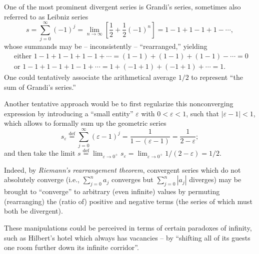 One of the most prominent divergent series is Grandi's series,\cite{Sloane_oeis.org/A033999}
sometimes also referred to as
Leibniz series\cite{leibnitz-1860,moore-1938,Hardy:1949,everest-2003}
\begin{equation}
s = \sum_{j=0}^\infty (-1)^j=
\lim_{n \rightarrow \infty} \left[\frac{1}{2}+\frac{1}{2}\left( -1\right)^n\right]
=1-1+1-1+1-\cdots ,
\label{2009-fiftyfifty-1s}
\end{equation}
whose summands may be -- inconsistently
-- ``rearranged,''
yielding
\begin{equation*}
\begin{split}
\textrm{ either }
1-1+1-1+1-1+\cdots = (1-1)+(1-1)+(1-1)-\cdots =0\\
\textrm{ or }
1-1+1-1+1-1+\cdots = 1+(-1+1)+ (-1+1) +\cdots =1.
\end{split}
\end{equation*}
One could tentatively associate the arithmetical average $1/2$ to represent ``the sum of Grandi's series.''

Another tentative approach  would be to first regularize this nonconverging expression by introducing a ``small entity''
$\varepsilon$ with $0 < \varepsilon <1$, such that $\vert \varepsilon - 1 \vert  <1$, which allows to formally sum up the geometric series
\begin{equation*}
s_\varepsilon \stackrel{\text{def}}{=} \sum_{j=0}^\infty (\varepsilon -1)^j=\frac{1}{1-(\varepsilon -1)}   =\frac{1}{2- \varepsilon  };
\end{equation*}
and then take the limit $s \stackrel{\text{def}}{=}  \lim_{\varepsilon \rightarrow 0^+} s_\varepsilon
= \lim_{\varepsilon \rightarrow 0^+}  1/(2- \varepsilon  ) =   1/2$.

Indeed, by {\em Riemann's rearrangement theorem},
convergent series  which do not absolutely converge
(i.e., $\sum_{j=0}^n a_j$ converges but $\sum_{j=0}^n \left| a_j \right|$ diverges)
may be brought to  ``converge'' to arbitrary (even infinite) values
by permuting (rearranging) the (ratio of) positive and negative terms
(the series of which must both be divergent).

These manipulations
could be perceived in terms of certain
paradoxes of infinity, such as Hilbert's hotel
which always has vacancies -- by ``shifting all of its guests one room further
down its infinite corridor''.\cite{rucker}



